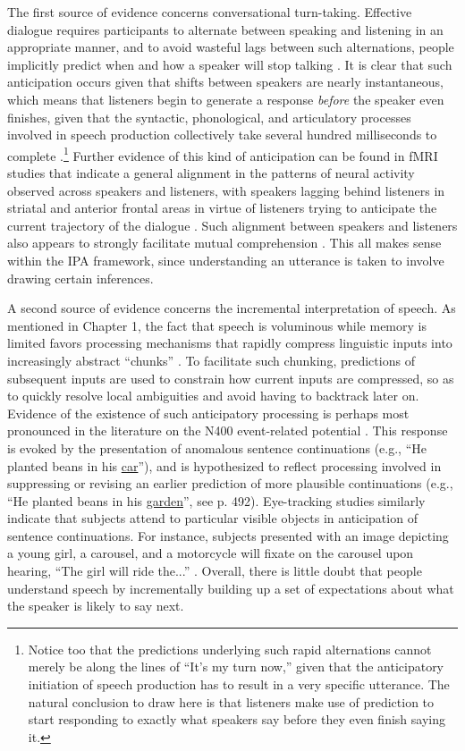 The first source of evidence concerns conversational turn-taking. Effective dialogue requires participants to alternate between speaking and listening in an appropriate manner, and to avoid wasteful lags between such alternations, people implicitly predict when and how a speaker will stop talking \citep{Christiansen:2015,Pickering:2013}. It is clear that such anticipation occurs given that shifts between speakers are nearly instantaneous, which means that listeners begin to generate a response \textit{before} the speaker even finishes, given that the syntactic, phonological, and articulatory processes involved in speech production collectively take several hundred milliseconds to complete \citep{Pickering:2013}.\footnote{Notice too that the predictions underlying such rapid alternations cannot merely be along the lines of ``It's my turn now,'' given that the anticipatory initiation of speech production has to result in a very specific utterance. The natural conclusion to draw here is that listeners make use of prediction to start responding to exactly what speakers say before they even finish saying it.} Further evidence of this kind of anticipation can be found in fMRI studies that indicate a general alignment in the patterns of neural activity observed across speakers and listeners, with speakers lagging behind listeners in striatal and anterior frontal areas in virtue of listeners trying to anticipate the current trajectory of the dialogue \citep[reviewed in][]{Christiansen:2015}.  Such alignment between speakers and listeners also appears to strongly facilitate mutual comprehension \citep{Pickering:2013,Christiansen:2015}. This all makes sense within the IPA framework, since understanding an utterance is taken to involve drawing certain inferences.

A second source of evidence concerns the incremental interpretation of speech. As mentioned in Chapter 1, the fact that speech is voluminous while memory is limited favors processing mechanisms that rapidly compress linguistic inputs into increasingly abstract ``chunks'' \citep{Christiansen:2015}. To facilitate such chunking, predictions of subsequent inputs are used to constrain how current inputs are compressed, so as to quickly resolve local ambiguities and avoid having to backtrack later on. Evidence of the existence of such anticipatory processing is perhaps most pronounced in the literature on the N400 event-related potential \citep{Federmeier:2007}. This response is evoked by the presentation of anomalous sentence continuations (e.g., ``He planted beans in his \underline{car}''), and is hypothesized to reflect processing involved in suppressing or revising an earlier prediction of more plausible continuations (e.g., ``He planted beans in his \underline{garden}'', see p. 492). Eye-tracking studies similarly indicate that subjects attend to particular visible objects in anticipation of sentence continuations. For instance, subjects presented with an image depicting a young girl, a carousel, and a motorcycle will fixate on the carousel upon hearing, ``The girl will ride the...'' \citep[][p. 194]{Kutas:2009}. Overall, there is little doubt that people understand speech by incrementally building up a set of expectations about what the speaker is likely to say next. 

